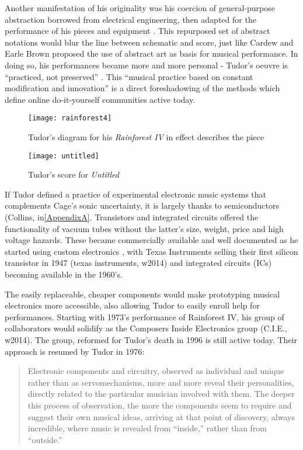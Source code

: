 \begin{itemize}
Another manifestation of his originality was his coercion of general-purpose abstraction borrowed from electrical engineering, then adapted for the performance of his pieces and equipment \citep{kuivila2004}. This repurposed set of abstract notations would blur the line between schematic and score, just like Cardew and Earle Brown proposed the use of abstract art as basis for musical performance. In doing so, his performances became more and more personal - Tudor’s oeuvre is “practiced, not preserved” \citep{kuivila1998}. This “musical practice based on constant modification and innovation” \citep{driscoll2004} is a direct foreshadowing of the methods which define online do-it-yourself communities active today. 

	\begin{figure}[h!]
	  \caption{Tudor's diagram for his \emph{Rainforest IV} in effect describes the piece}
	  \centering
	    \texttt{[image: rainforest4]}
	\end{figure}

	\begin{figure}[h!]
	  \caption{Tudor's score for \emph{Untitled}}
	  \centering
	    \texttt{[image: untitled]}
	\end{figure}

If Tudor defined a practice of experimental electronic music systems that complements Cage’s sonic uncertainty, it is largely thanks to semiconductors (Collins, in\ref{AppendixA}. Transistors and integrated circuits offered the functionality of vacuum tubes without the latter’s size, weight, price and high voltage hazards. These became commercially available and well documented as he started using custom electronics \citep{collins2004}, with Texas Instruments selling their first silicon transistor in 1947 (texas instruments, w2014) and integrated circuits (ICs) becoming available in the 1960’s.  

The easily replaceable, cheaper components would make prototyping musical electronics more accessible, also allowing Tudor to easily enroll help for performances. Starting with 1973’s performance of Rainforest IV, his group of collaborators would solidify as the Composers Inside Electronics group (C.I.E., w2014). The group, reformed for Tudor’s death in 1996 is still active today. Their approach is resumed by Tudor in 1976: 

\begin{quote}
						
Electronic components and circuitry, observed as individual and unique rather than as servomechanisms, more and more reveal their personalities, directly related to the particular musician involved with them. The deeper this process of observation, the more the components seem to require and suggest their own musical ideas, arriving at that point of discovery, always incredible, where music is revealed from ``inside,'' rather than from ``outside.'' \citep{tudor1976,nakai2014}


\end{quote}
\end{itemize}

